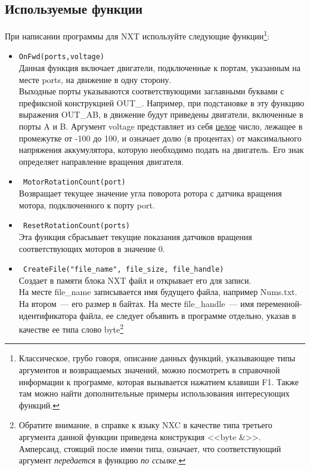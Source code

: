\documentclass[12pt,a4paper,openany]{extarticle}
\begin{document}
\subsection{Используемые функции}
\hspace*{\parindent}При написании программы для NXT используйте следующие функции\footnote{Классическое, грубо говоря, описание данных функций, указывающее типы аргументов и возвращаемых значений, можно посмотреть в справочной информации к программе, которая вызывается нажатием клавиши F1.
Также там можно найти дополнительные примеры использования интересующих функций.}:
\begin{itemize}
\item \verb|OnFwd(ports,voltage)|\\
Данная функция включает двигатели, подключенные к портам, указанным на месте ports, на движение в одну сторону.
\\Выходные порты указываются соответствующими заглавными буквами с префиксной конструкцией OUT\_. 
Например, при подстановке в эту функцию выражения OUT\_AB, в движение будут приведены двигатели, включенные в порты A и B. 
Аргумент voltage представляет из себя \underline{целое} число, лежащее в промежутке от -100 до 100, и означает долю (в процентах) от максимального напряжения аккумулятора, которую необходимо подать на двигатель.
Его знак определяет направление вращения двигателя.
\item \verb| MotorRotationCount(port)|\\
Возвращает текущее значение угла поворота ротора с датчика вращения мотора, подключенного к порту port. 
\item \verb| ResetRotationCount(ports)|\\
Эта функция сбрасывает текущие показания датчиков вращения соответствующих моторов в значение 0.
\item \verb| CreateFile("file_name", file_size, file_handle)|\\
Создает в памяти блока NXT файл и открывает его для записи.\\
На месте file\_name записывается имя будущего файла, например Nums.txt.
На втором~--- его размер в байтах. 
На месте file\_handle~--- имя переменной-идентификатора файла, ее следует объявить в программе отдельно, указав в качестве ее типа слово byte\footnote{Обратите внимание, в справке к языку NXC в качестве типа третьего аргумента данной функции приведена конструкция <<byte \&>>.
Амперсанд, стоящий после имени типа, означает, что соответствующий аргумент \textit{передается} в функцию \textit{по ссылке}. 
}
\end{itemize}
\end{document}
